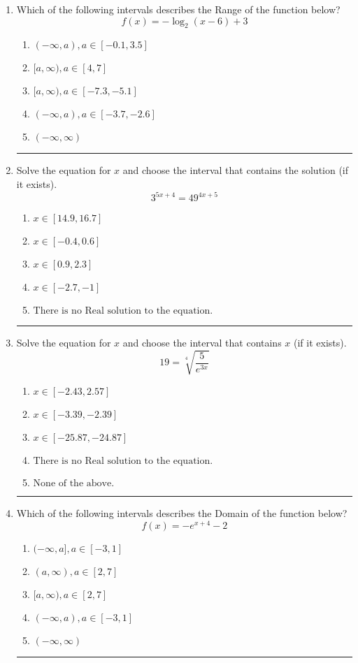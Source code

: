 \documentclass[14pt]{extbook}
\newcommand{\litem}[1]{\item#1\hspace*{-1cm}\rule{\textwidth}{0.4pt}}
\begin{document}
\begin{enumerate}
\litem{
Which of the following intervals describes the Range of the function below?\[ f(x) = -\log_2{(x-6)}+3 \]\begin{enumerate}[label=\Alph*.]
\item \( (-\infty, a), a \in [-0.1, 3.5] \)
\item \( [a, \infty), a \in [4, 7] \)
\item \( [a, \infty), a \in [-7.3, -5.1] \)
\item \( (-\infty, a), a \in [-3.7, -2.6] \)
\item \( (-\infty, \infty) \)

\end{enumerate} }
\litem{
Solve the equation for $x$ and choose the interval that contains the solution (if it exists).\[ 3^{5x+4} = 49^{4x+5} \]\begin{enumerate}[label=\Alph*.]
\item \( x \in [14.9, 16.7] \)
\item \( x \in [-0.4, 0.6] \)
\item \( x \in [0.9, 2.3] \)
\item \( x \in [-2.7, -1] \)
\item \( \text{There is no Real solution to the equation.} \)

\end{enumerate} }
\litem{
 Solve the equation for $x$ and choose the interval that contains $x$ (if it exists).\[  19 = \sqrt[4]{\frac{5}{e^{3x}}} \]\begin{enumerate}[label=\Alph*.]
\item \( x \in [-2.43, 2.57] \)
\item \( x \in [-3.39, -2.39] \)
\item \( x \in [-25.87, -24.87] \)
\item \( \text{There is no Real solution to the equation.} \)
\item \( \text{None of the above.} \)

\end{enumerate} }
\litem{
Which of the following intervals describes the Domain of the function below?\[ f(x) = -e^{x+4}-2 \]\begin{enumerate}[label=\Alph*.]
\item \( (-\infty, a], a \in [-3, 1] \)
\item \( (a, \infty), a \in [2, 7] \)
\item \( [a, \infty), a \in [2, 7] \)
\item \( (-\infty, a), a \in [-3, 1] \)
\item \( (-\infty, \infty) \)


\end{enumerate}}
\end{enumerate}
\end{document}
